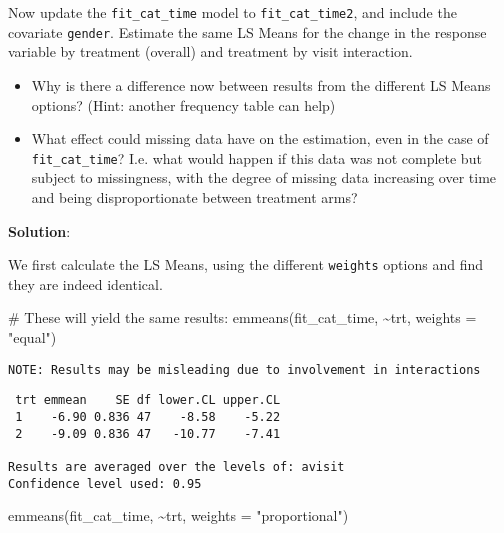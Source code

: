 \documentclass[
  letterpaper,
  DIV=11,
  numbers=noendperiod]{scrreprt}
\newenvironment{Shaded}{\begin{snugshade}}{\end{snugshade}}
\newcommand{\AttributeTok}[1]{\textcolor[rgb]{0.40,0.45,0.13}{#1}}
\newcommand{\CommentTok}[1]{\textcolor[rgb]{0.37,0.37,0.37}{#1}}
\newcommand{\FunctionTok}[1]{\textcolor[rgb]{0.28,0.35,0.67}{#1}}
\newcommand{\NormalTok}[1]{\textcolor[rgb]{0.00,0.23,0.31}{#1}}
\newcommand{\SpecialCharTok}[1]{\textcolor[rgb]{0.37,0.37,0.37}{#1}}
\newcommand{\StringTok}[1]{\textcolor[rgb]{0.13,0.47,0.30}{#1}}
\begin{document}
Now update the \texttt{fit\_cat\_time} model to
\texttt{fit\_cat\_time2}, and include the covariate \texttt{gender}.
Estimate the same LS Means for the change in the response variable by
treatment (overall) and treatment by visit interaction.

\begin{itemize}
\item
  Why is there a difference now between results from the different LS
  Means options? (Hint: another frequency table can help)
\item
  What effect could missing data have on the estimation, even in the
  case of \texttt{fit\_cat\_time}? I.e. what would happen if this data
  was not complete but subject to missingness, with the degree of
  missing data increasing over time and being disproportionate between
  treatment arms?
\end{itemize}

\textbf{Solution}:

We first calculate the LS Means, using the different \texttt{weights}
options and find they are indeed identical.

\begin{Shaded}
\begin{Highlighting}[]
\CommentTok{\# These will yield the same results:}
\FunctionTok{emmeans}\NormalTok{(fit\_cat\_time, }\SpecialCharTok{\textasciitilde{}}\NormalTok{trt, }\AttributeTok{weights =} \StringTok{"equal"}\NormalTok{)}
\end{Highlighting}
\end{Shaded}

\begin{verbatim}
NOTE: Results may be misleading due to involvement in interactions
\end{verbatim}

\begin{verbatim}
 trt emmean    SE df lower.CL upper.CL
 1    -6.90 0.836 47    -8.58    -5.22
 2    -9.09 0.836 47   -10.77    -7.41

Results are averaged over the levels of: avisit 
Confidence level used: 0.95 
\end{verbatim}

\begin{Shaded}
\begin{Highlighting}[]
\FunctionTok{emmeans}\NormalTok{(fit\_cat\_time, }\SpecialCharTok{\textasciitilde{}}\NormalTok{trt, }\AttributeTok{weights =} \StringTok{"proportional"}\NormalTok{)}
\end{Highlighting}
\end{Shaded}
\end{document}
